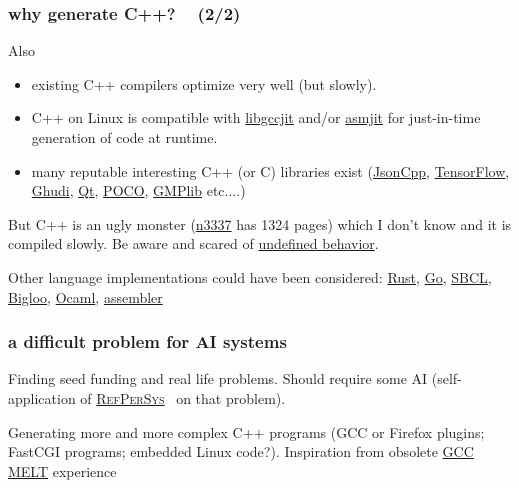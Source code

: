\documentclass[xcolor=svgnames,final,smaller,a4]{beamer}
\newcommand{\RefPerSys}{\href{http://refpersys.org}{\textsc{RefPerSys}}}
\begin{document}
  
  \begin{frame}
    \frametitle{why generate C++? ~ (2/2)}

    Also
    \begin{itemize}

      \item existing C++ compilers optimize very well (but slowly).
      \item C++ on Linux is compatible with
        \href{https://gcc.gnu.org/onlinedocs/jit/}{libgccjit} and/or
        \href{https://asmjit.com/}{asmjit} for just-in-time
        generation of code at runtime.
      \item many reputable interesting C++ (or C) libraries exist
        (\href{https://github.com/open-source-parsers/jsoncpp}{JsonCpp},
        \href{https://tensorflow.org/}{TensorFlow},
        \href{https://project.inria.fr/gudhi/}{Ghudi},
        \href{https://qt.io/}{Qt},
        \href{https://pocoproject.org/}{POCO},
        \href{https://gmplib.org/}{GMPlib} etc....)
    \end{itemize}

    \bigskip
    
   But C++ is an ugly monster
   (\href{http://www.open-std.org/jtc1/sc22/wg21/docs/papers/2012/n3337.pdf}{n3337}
   has 1324 pages) which I don't know and it is compiled slowly. Be aware
   and scared of
   \href{http://blog.llvm.org/2011/05/what-every-c-programmer-should-know.html}{undefined
     behavior}.

   \medskip
   
    Other language implementations could have been considered:
    \href{http://rust-lang.org/}{Rust},
    \href{https://go-lang.org/}{Go}, \href{https://sbcl.org/}{SBCL},
    \href{https://www-sop.inria.fr/mimosa/fp/Bigloo/}{Bigloo},
    \href{https://ocaml.org/}{Ocaml},
    \href{http://www.tldp.org/HOWTO/Assembly-HOWTO/}{assembler}
  \end{frame}
  


  
  \begin{frame}
    \frametitle{a difficult problem for AI systems}

    \medskip
    
    Finding seed funding and real life problems. Should require some AI (self-application of \RefPerSys~ on that problem).

    \bigskip
    
    Generating more and more complex C++ programs (GCC or Firefox
    plugins; FastCGI programs; embedded Linux code?). Inspiration from
    obsolete \href{http://www.starynkevitch.net/Basile/gcc-melt/}{GCC
      MELT} experience {}
    
  \end{frame}
\end{document}
